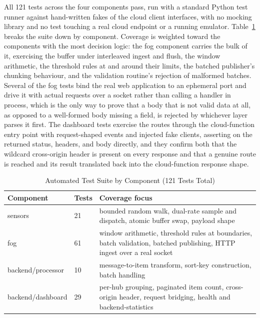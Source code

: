 \documentclass[conference]{IEEEtran}
\begin{document}
All 121 tests across the four components pass, run with a standard Python test runner against hand-written fakes of the cloud client interfaces, with no mocking library and no test touching a real cloud endpoint or a running emulator. Table~\ref{tab:tests} breaks the suite down by component. Coverage is weighted toward the components with the most decision logic: the fog component carries the bulk of it, exercising the buffer under interleaved ingest and flush, the window arithmetic, the threshold rules at and around their limits, the batched publisher's chunking behaviour, and the validation routine's rejection of malformed batches. Several of the fog tests bind the real web application to an ephemeral port and drive it with actual requests over a socket rather than calling a handler in process, which is the only way to prove that a body that is not valid data at all, as opposed to a well-formed body missing a field, is rejected by whichever layer parses it first. The dashboard tests exercise the routes through the cloud-function entry point with request-shaped events and injected fake clients, asserting on the returned status, headers, and body directly, and they confirm both that the wildcard cross-origin header is present on every response and that a genuine route is reached and its result translated back into the cloud-function response shape.

\begin{table}[!t]
\caption{Automated Test Suite by Component (121 Tests Total)}
\label{tab:tests}
\centering
\footnotesize
\begin{tabular}{|>{\raggedright\arraybackslash}p{2.0cm}|p{0.9cm}|>{\raggedright\arraybackslash}p{4.2cm}|}
\hline
\textbf{Component} & \textbf{Tests} & \textbf{Coverage focus} \\
\hline
sensors & 21 & bounded random walk, dual-rate sample and dispatch, atomic buffer swap, payload shape \\
\hline
fog & 61 & window arithmetic, threshold rules at boundaries, batch validation, batched publishing, HTTP ingest over a real socket \\
\hline
backend/processor & 10 & message-to-item transform, sort-key construction, batch handling \\
\hline
backend/dashboard & 29 & per-hub grouping, paginated item count, cross-origin header, request bridging, health and backend-statistics \\
\hline
\end{tabular}
\end{table}
\end{document}
